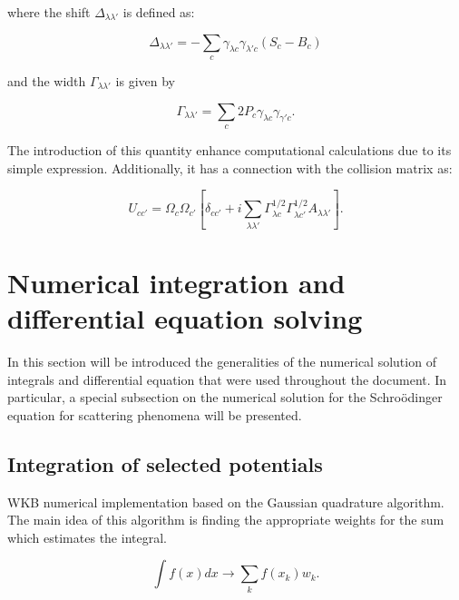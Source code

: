 \documentclass[openany]{book}
\begin{document}
where the shift $\Delta_{\lambda\lambda'}$  is defined as: 

\begin{equation}\label{eq:numericalRmatrix_A_shift}
	\Delta_{\lambda\lambda'} = -\sum_{c}{\gamma_{\lambda c}\gamma_{\lambda'c}(S_c - B_c)}
\end{equation}

and the width $\Gamma_{\lambda \lambda'}$ is given by 

\begin{equation}\label{eq:numericalRmatrix_A_width}
	\Gamma_{\lambda \lambda'} = \sum_{c}{2P_c\gamma_{\lambda c}\gamma_{\gamma'c}}.
\end{equation}

The introduction of this quantity enhance computational calculations due to its simple expression. Additionally, it has a connection with the collision matrix as:

\begin{equation}\label{eq:numericalRmatrix_A_collision}
	U_{cc'} = \Omega_{c}\Omega_{c'} \left[\delta_{cc'} + i \sum_{\lambda \lambda'} \Gamma^{1/2}_{\lambda c}  \Gamma^{1/2}_{\lambda c'} A_{\lambda \lambda'}\right].
\end{equation}

\chapter{Numerical integration and differential equation solving} \label{ap:numericalSolving}


In this section will be introduced the generalities of the numerical solution of integrals and differential equation that were used throughout the document. In particular, a special subsection on the numerical solution for the Schroödinger equation for scattering phenomena will be presented. 

\section{Integration of selected potentials} \label{sec:integrationPotentials}

WKB numerical implementation based on the Gaussian quadrature algorithm. \\

The main idea of this algorithm is finding the appropriate weights for the sum which estimates the integral. 

\begin{equation}\label{eq:numericalIntegration_gaussianQuadrature}
	\int f(x) dx \rightarrow \sum_{k}{ f(x_k) w_k}.
\end{equation}
\end{document}
